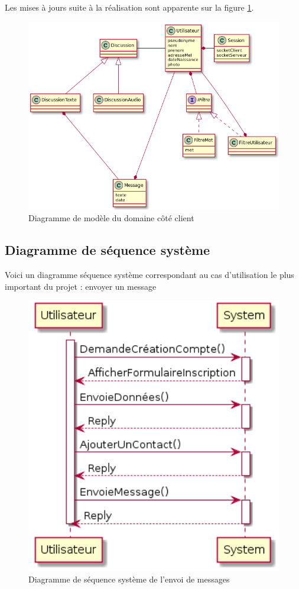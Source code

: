 		Les mises à jours suite à la réalisation sont apparente sur la figure \ref{modeleDomaineClient}.

	\begin{figure}[H]
	\centerline{\includegraphics[width=16.5cm]{img/modeleDomaineClient.png}}
		\caption{Diagramme de modèle du domaine côté client}
		\label{modeleDomaineClient}
	\end{figure}

	\newpage

	\subsection{Diagramme de séquence système}


	Voici un diagramme séquence système correspondant au cas d'utilisation le plus important du projet : envoyer un message
	\begin{figure}[H]
		\centerline{\includegraphics[width=12.5cm]{img/sequenceSystemeEnvoiMessage.png}}
		\caption{Diagramme de séquence système de l'envoi de messages}
	\end{figure}

